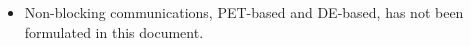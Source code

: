 
\begin{itemize}
\item Non-blocking communications, PET-based and DE-based, has not been formulated in this document.
\end{itemize}
